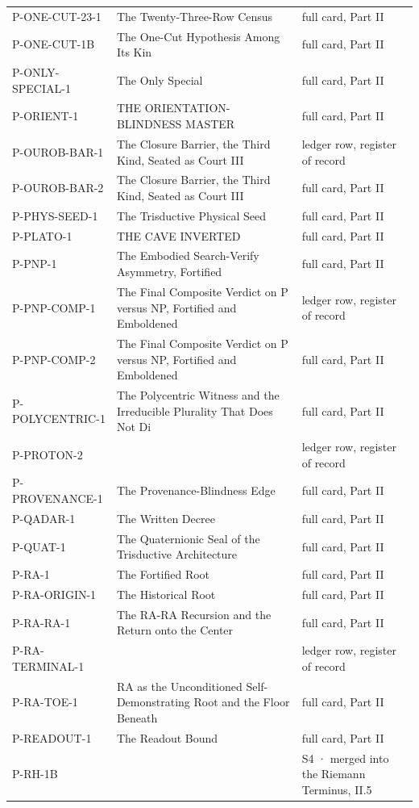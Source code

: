 \documentclass[10pt,twocolumn]{article}
\begin{document}
\begin{center}
\begin{longtable}{>{\raggedright\arraybackslash}p{}>{\raggedright\arraybackslash}p{}>{\raggedright\arraybackslash}p{}}
P-ONE-CUT-23-1 & The Twenty-Three-Row Census & full card, Part II \\
P-ONE-CUT-1B & The One-Cut Hypothesis Among Its Kin & full card, Part II \\
P-ONLY-SPECIAL-1 & The Only Special & full card, Part II \\
P-ORIENT-1 & THE ORIENTATION-BLINDNESS MASTER & full card, Part II \\
P-OUROB-BAR-1 & The Closure Barrier, the Third Kind, Seated as Court III & ledger row, register of record \\
P-OUROB-BAR-2 & The Closure Barrier, the Third Kind, Seated as Court III & full card, Part II \\
P-PHYS-SEED-1 & The Trisductive Physical Seed & full card, Part II \\
P-PLATO-1 & THE CAVE INVERTED & full card, Part II \\
P-PNP-1 & The Embodied Search-Verify Asymmetry, Fortified & full card, Part II \\
P-PNP-COMP-1 & The Final Composite Verdict on P versus NP, Fortified and Emboldened & ledger row, register of record \\
P-PNP-COMP-2 & The Final Composite Verdict on P versus NP, Fortified and Emboldened & full card, Part II \\
P-POLYCENTRIC-1 & The Polycentric Witness and the Irreducible Plurality That Does Not Di & full card, Part II \\
P-PROTON-2 &  & ledger row, register of record \\
P-PROVENANCE-1 & The Provenance-Blindness Edge & full card, Part II \\
P-QADAR-1 & The Written Decree & full card, Part II \\
P-QUAT-1 & The Quaternionic Seal of the Trisductive Architecture & full card, Part II \\
P-RA-1 & The Fortified Root & full card, Part II \\
P-RA-ORIGIN-1 & The Historical Root & full card, Part II \\
P-RA-RA-1 & The RA-RA Recursion and the Return onto the Center & full card, Part II \\
P-RA-TERMINAL-1 &  & ledger row, register of record \\
P-RA-TOE-1 & RA as the Unconditioned Self-Demonstrating Root and the Floor Beneath & full card, Part II \\
P-READOUT-1 & The Readout Bound & full card, Part II \\
P-RH-1B &  & S4 · merged into the Riemann Terminus, II.5 \\

\end{longtable}
\end{center}
\end{document}
